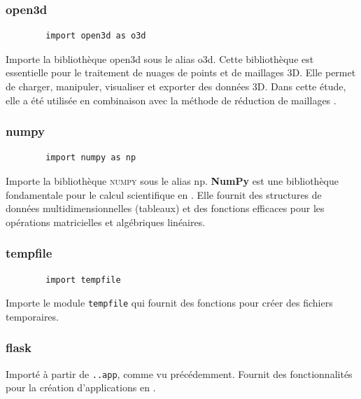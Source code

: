         \subsubsection{open3d}
        
        \begin{lstlisting}
        import open3d as o3d
        \end{lstlisting}
        
        Importe la bibliothèque open3d sous le alias o3d. Cette bibliothèque est essentielle pour le traitement de nuages de points et de maillages 3D. Elle permet de charger, manipuler, visualiser et exporter des données 3D. Dans cette étude, elle a été utilisée en combinaison avec la méthode de réduction de maillages .

        \subsubsection{numpy}
        
        \begin{lstlisting}
        import numpy as np
        \end{lstlisting}
        
        Importe la bibliothèque \textsc{numpy} sous le alias np. \textbf{NumPy} est une bibliothèque fondamentale pour le calcul scientifique en \py. Elle fournit des structures de données multidimensionnelles (tableaux) et des fonctions efficaces pour les opérations matricielles et algébriques linéaires.

        \subsubsection{tempfile}
        
        \begin{lstlisting}
        import tempfile
        \end{lstlisting}
        
        Importe le module \texttt{tempfile} qui fournit des fonctions pour créer des fichiers temporaires.

        \subsubsection{flask}

        Importé à partir de \texttt{..app}, comme vu précédemment. Fournit des fonctionnalités pour la création d'applications  en \py.

